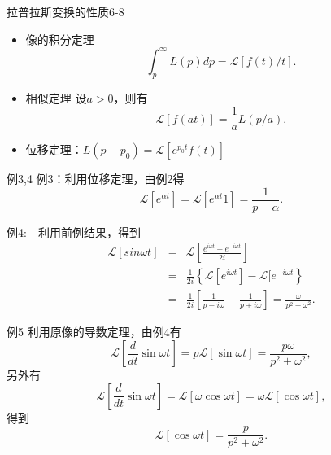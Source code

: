 \documentclass[11pt]{beamer}
\begin{document}
\begin{frame}{拉普拉斯变换的性质6-8}
\begin{itemize}
\item [6] 像的积分定理
\begin{equation}
\int^\infty_p L(p) dp = \mathscr{L}[ f(t)/t ].
\end{equation}

\item [7] 相似定理
设$a>0$，则有
\begin{equation}
\mathscr{L}[ f(at) ] = \frac{1}{a} L(p/a).
\end{equation}

\item [8] 位移定理：$L(p-p_0) = \mathscr{L}[ e^{p_0 t} f(t) ]$

\end{itemize}

\end{frame}

\begin{frame}{例3,4}
例3：利用位移定理，由例2得
\begin{equation}
\mathscr{L}[ e^{ \alpha t} ] = \mathscr{L}[ e^{ \alpha t} 1 ] = \frac{1}{p - \alpha}.
\end{equation}

例4:　利用前例结果，得到
\begin{eqnarray}
\mathscr{L}[ sin \omega t] &=& \mathscr{L}[ \frac{e^{i\omega t} - e^{-i\omega t} }{2i} ]
\nonumber\\ 
&=& \frac{1}{2i}\left\{ \mathscr{L}[e^{i\omega t}] - \mathscr{L}[e^{-i\omega t} \right\}
\nonumber\\
&=& \frac{1}{2i}[ \frac{1}{p-i\omega}  - \frac{1}{p+i\omega} ] = \frac{\omega}{p^2+\omega^2}.
\end{eqnarray}

\end{frame}

\begin{frame}{例5}
利用原像的导数定理，由例4有
\begin{equation}
\mathscr{L}[ \frac{d}{dt}\sin \omega t ] = p \mathscr{L}[ \sin \omega t ] = \frac{p \omega}{p^2 + \omega^2},
\end{equation}
另外有
\begin{equation}
\mathscr{L}[ \frac{d}{dt} \sin \omega t ] = \mathscr{L}[ \omega \cos \omega t ]
= \omega \mathscr{L}[ \cos \omega t ], 
\end{equation}
得到
\begin{equation}
\mathscr{L}[ \cos \omega t ] = \frac{p}{p^2 + \omega^2}.
\end{equation}
\end{frame}
\end{document}
